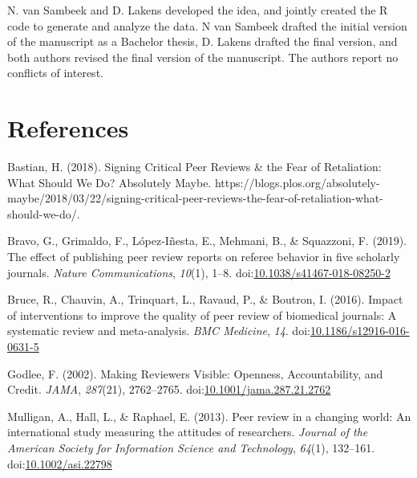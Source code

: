 \documentclass[,jou, a4paper,floatsintext]{apa6}
\begin{document}
N. van Sambeek and D. Lakens developed the idea, and jointly created the R code to generate and analyze the data. N van Sambeek drafted the initial version of the manuscript as a Bachelor thesis, D. Lakens drafted the final version, and both authors revised the final version of the manuscript. The authors report no conflicts of interest.

\hypertarget{references}{%
\section{References}\label{references}}

\setlength{\parindent}{-0.5in}
\setlength{\leftskip}{0.5in}

\hypertarget{refs}{}
\leavevmode\hypertarget{ref-bastian_signing_2018}{}%
Bastian, H. (2018). Signing Critical Peer Reviews \& the Fear of Retaliation: What Should We Do? \textbar{} Absolutely Maybe. https://blogs.plos.org/absolutely-maybe/2018/03/22/signing-critical-peer-reviews-the-fear-of-retaliation-what-should-we-do/.

\leavevmode\hypertarget{ref-bravo_effect_2019}{}%
Bravo, G., Grimaldo, F., López-Iñesta, E., Mehmani, B., \& Squazzoni, F. (2019). The effect of publishing peer review reports on referee behavior in five scholarly journals. \emph{Nature Communications}, \emph{10}(1), 1--8. doi:\href{https://doi.org/10.1038/s41467-018-08250-2}{10.1038/s41467-018-08250-2}

\leavevmode\hypertarget{ref-bruce_impact_2016}{}%
Bruce, R., Chauvin, A., Trinquart, L., Ravaud, P., \& Boutron, I. (2016). Impact of interventions to improve the quality of peer review of biomedical journals: A systematic review and meta-analysis. \emph{BMC Medicine}, \emph{14}. doi:\href{https://doi.org/10.1186/s12916-016-0631-5}{10.1186/s12916-016-0631-5}

\leavevmode\hypertarget{ref-godlee_making_2002}{}%
Godlee, F. (2002). Making Reviewers Visible: Openness, Accountability, and Credit. \emph{JAMA}, \emph{287}(21), 2762--2765. doi:\href{https://doi.org/10.1001/jama.287.21.2762}{10.1001/jama.287.21.2762}

\leavevmode\hypertarget{ref-mulligan_peer_2013}{}%
Mulligan, A., Hall, L., \& Raphael, E. (2013). Peer review in a changing world: An international study measuring the attitudes of researchers. \emph{Journal of the American Society for Information Science and Technology}, \emph{64}(1), 132--161. doi:\href{https://doi.org/10.1002/asi.22798}{10.1002/asi.22798}
\end{document}
